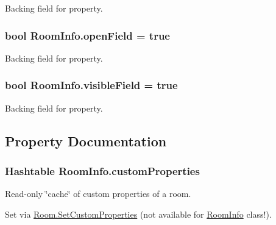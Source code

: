 Backing field for property.

\subsubsection[{\texorpdfstring{open\+Field}{openField}}]{\setlength{\rightskip}{0pt plus 5cm}bool Room\+Info.\+open\+Field = true\hspace{0.3cm}{\ttfamily [protected]}}\hypertarget{class_room_info_a6ee1a8dc240cfc8f983192806e751f14}{}\label{class_room_info_a6ee1a8dc240cfc8f983192806e751f14}


Backing field for property.

\subsubsection[{\texorpdfstring{visible\+Field}{visibleField}}]{\setlength{\rightskip}{0pt plus 5cm}bool Room\+Info.\+visible\+Field = true\hspace{0.3cm}{\ttfamily [protected]}}\hypertarget{class_room_info_a9fe8d4b4891f2d6e57dcd774048f2545}{}\label{class_room_info_a9fe8d4b4891f2d6e57dcd774048f2545}


Backing field for property.



\subsection{Property Documentation}
\subsubsection[{\texorpdfstring{custom\+Properties}{customProperties}}]{\setlength{\rightskip}{0pt plus 5cm}Hashtable Room\+Info.\+custom\+Properties\hspace{0.3cm}{\ttfamily [get]}}\hypertarget{class_room_info_a928b103a3e88d2c090152440aa6fa874}{}\label{class_room_info_a928b103a3e88d2c090152440aa6fa874}


Read-\/only \char`\"{}cache\char`\"{} of custom properties of a room. 

Set via \hyperlink{class_room_a9f8ac164f4f24be4140221b72792250a}{Room.\+Set\+Custom\+Properties} (not available for \hyperlink{class_room_info}{Room\+Info} class!).


